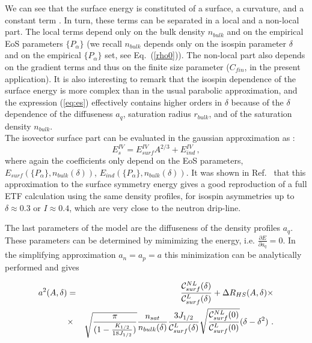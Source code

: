 \documentclass
[aps,prc,twocolumn,showpacs,showkeys,amsmath,floatfix,superscriptaddress]{revtex4}
\begin{document}
{We can see that the surface energy is constituted of a surface, a curvature,  and a constant term \cite{meyers}. 
In turn, these terms can be separated in a local and a non-local part. The local terms depend only on the bulk density $n_{bulk}$ and on the empirical EoS parameters $\{P_\alpha\}$ (we
 recall $n_{bulk}$ depends only on the isospin parameter $\delta$ and on the empirical $\{P_\alpha\}$ set, see Eq.~(\ref{rho0})). The non-local part also depends on the gradient terms and thus on the finite size parameter ($C_{fin}$, in the present application). 
It is also interesting to remark that the isospin dependence of the surface energy is more complex than in the usual parabolic approximation, and the expression (\ref{eq:es}) effectively contains higher orders in $\delta$ because of the $\delta$ dependence of the diffuseness $a_q$, saturation radius $r_{bulk}$, and of the saturation density $n_{bulk}$. 
\\
The isovector surface part can be evaluated in the gaussian approximation as \cite{Francois2}:
\begin{equation}
E_s^{IV} = E_{surf}^{IV} A^{2/3} + E_{ind}^{IV} \,, \label{eq:e_s^nl}
\end{equation}
where again the coefficients only depend on the EoS parameters, $E_{surf}(\{P_\alpha\}, n_{bulk}(\delta))$, $E_{ind}(\{P_\alpha\}, n_{bulk}(\delta))$.
It was shown in Ref.~\cite{Francois2} that this approximation to the surface symmetry energy gives a good reproduction of a full ETF calculation
using the same density profiles, for isospin asymmetries up to $\delta\approx 0.3$ or $I\approx 0.4$, which are very close to the neutron drip-line.

The last parameters of the model are the diffuseness of the density profiles $a_q$. 
These parameters  can be determined by mimimizing the energy, 
i.e. $ \frac{\partial E}{\partial a_q} = 0$. In the simplifying approximation $a_n=a_p=a$ this minimization can be analytically performed and gives \cite{Francois2}

\begin{eqnarray}
a^2 (A,\delta) &=& \frac{{\cal{C}}^{NL}_{surf} (\delta)}{{\cal{C}}^L_{surf} (\delta) }
+ \Delta R_{HS} (A,\delta)\times \label{eq:diffuseness}  \\
&\times& \sqrt{\frac{\pi}{(1-\frac{K_{1/2}}{18 J_{1/2}})}} \frac{ n_{sat}}{ n_{bulk}(\delta)} 
\frac{3 J_{1/2}}{{\cal{C}}^L_{surf}(\delta)} 
\sqrt{\frac{{\cal{C}}^{NL}_{surf}(0)}{{\cal{C}}^L_{surf}(0)} }
 (\delta-\delta^2)~. \nonumber 
\end{eqnarray}

}
\end{document}
